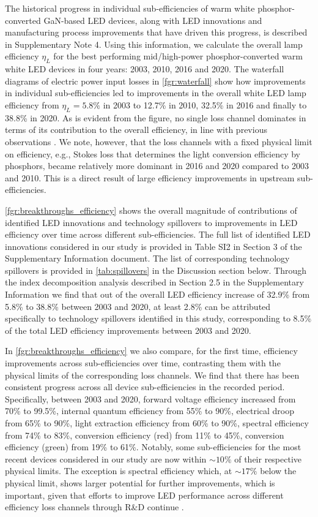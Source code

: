 \documentclass[parskip=full]{article}
\begin{document}
The historical progress in individual sub-efficiencies of warm white phosphor-converted GaN-based LED devices, along with LED innovations and manufacturing process improvements that have driven this progress, is described in Supplementary Note 4. Using this information, we calculate the overall lamp efficiency $\eta_L$ for the best performing mid/high-power phosphor-converted warm white LED devices in four years: 2003, 2010, 2016 and 2020. The waterfall diagrams of electric power input losses in \cref{fgr:waterfall} show how improvements in individual sub-efficiencies led to improvements in the overall white LED lamp efficiency from $\eta_L=5.8\%$ in 2003 to 12.7\% in 2010, 32.5\% in 2016 and finally to 38.8\% in 2020. As is evident from the figure, no single loss channel dominates in terms of its contribution to the overall efficiency, in line with previous observations \cite{tsao2010solid}. We note, however, that the loss channels with a fixed physical limit on efficiency, e.g., Stokes loss that determines the light conversion efficiency by phosphors, became relatively more dominant in 2016 and 2020 compared to 2003 and 2010.  This is a direct result of large efficiency improvements in upstream sub-efficiencies.

\cref{fgr:breakthroughs_efficiency} shows the overall magnitude of contributions of identified LED innovations and technology spillovers to improvements in LED efficiency over time across different sub-efficiencies. The full list of identified LED innovations considered in our study is provided in Table SI2 in Section 3 of the Supplementary Information document. The list of corresponding technology spillovers is provided in \cref{tab:spillovers} in the Discussion section below. Through the index decomposition analysis described in Section 2.5 in the Supplementary Information we find that out of the overall LED efficiency increase of 32.9\% from 5.8\% to 38.8\% between 2003 and 2020, at least 2.8\% can be attributed specifically to technology spillovers identified in this study, corresponding to 8.5\% of the total LED efficiency improvements between 2003 and 2020.

In \cref{fgr:breakthroughs_efficiency} we also compare, for the first time, efficiency improvements across sub-efficiencies over time, contrasting them with the physical limits of the corresponding loss channels. We find that there has been consistent progress across all device sub-efficiencies in the recorded period. Specifically, between 2003 and 2020, forward voltage efficiency increased from 70\% to 99.5\%, internal quantum efficiency from 55\% to 90\%, electrical droop from 65\% to 90\%, light extraction efficiency from 60\% to 90\%, spectral efficiency from 74\% to 83\%, conversion efficiency (red) from 11\% to 45\%, conversion efficiency (green) from 19\% to 61\%. Notably, some sub-efficiencies for the most recent devices considered in our study are now within $\sim10\%$ of their respective physical limits. The exception is spectral efficiency which, at $\sim17\%$ below the physical limit, shows larger potential for further improvements, which is important, given that efforts to improve LED performance across different efficiency loss channels through R\&D continue \cite{cho2017white, Weisbuch2020}. 
\end{document}
